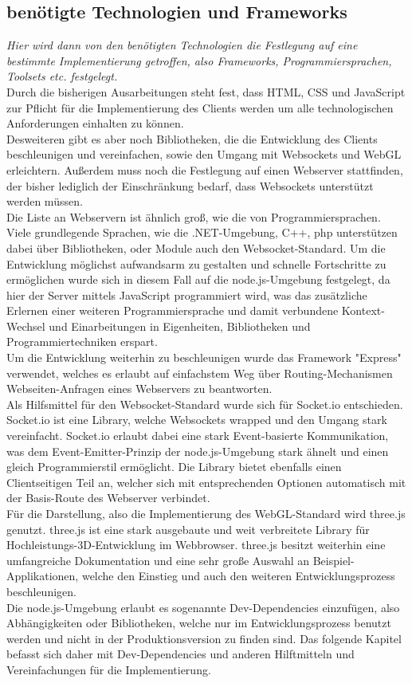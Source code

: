 \subsection{benötigte Technologien und Frameworks}
\label{subsec:Technologien}

\emph{Hier wird dann von den benötigten Technologien die Festlegung auf eine bestimmte Implementierung getroffen, also Frameworks, Programmiersprachen, Toolsets etc. festgelegt.}\\
Durch die bisherigen Ausarbeitungen steht fest, dass HTML, CSS und JavaScript zur Pflicht für die Implementierung des Clients werden um alle technologischen Anforderungen einhalten zu können.\\
Desweiteren gibt es aber noch Bibliotheken, die die Entwicklung des Clients beschleunigen und vereinfachen, sowie den Umgang mit Websockets und WebGL erleichtern. Außerdem muss noch die Festlegung auf einen Webserver stattfinden, der bisher lediglich der Einschränkung bedarf, dass Websockets unterstützt werden müssen.\\
Die Liste an Webservern ist ähnlich groß, wie die von Programmiersprachen. Viele grundlegende Sprachen, wie die .NET-Umgebung, C++, php \ua unterstützen dabei über Bibliotheken, oder Module auch den Websocket-Standard. Um die Entwicklung möglichst aufwandsarm zu gestalten und schnelle Fortschritte zu ermöglichen wurde sich in diesem Fall auf die node.js-Umgebung festgelegt, da hier der Server mittels JavaScript programmiert wird, was das zusätzliche Erlernen einer weiteren Programmiersprache und damit verbundene Kontext-Wechsel und Einarbeitungen in Eigenheiten, Bibliotheken und Programmiertechniken erspart.\\
Um die Entwicklung weiterhin zu beschleunigen wurde das Framework "Express" verwendet, welches es erlaubt auf einfachstem Weg über Routing-Mechanismen Webseiten-Anfragen eines Webservers zu beantworten.\\
Als Hilfsmittel für den Websocket-Standard wurde sich für Socket.io entschieden. Socket.io ist eine Library, welche Websockets wrapped und den Umgang stark vereinfacht. Socket.io erlaubt dabei eine stark Event-basierte Kommunikation, was dem Event-Emitter-Prinzip der node.js-Umgebung stark ähnelt und einen gleich Programmierstil ermöglicht. Die Library bietet ebenfalls einen Clientseitigen Teil an, welcher sich mit entsprechenden Optionen automatisch mit der Basis-Route des Webserver verbindet.\\
Für die Darstellung, also die Implementierung des WebGL-Standard wird three.js genutzt. three.js ist eine stark ausgebaute und weit verbreitete Library für Hochleistungs-3D-Entwicklung im Webbrowser. three.js besitzt weiterhin eine umfangreiche Dokumentation und eine sehr große Auswahl an Beispiel-Applikationen, welche den Einstieg und auch den weiteren Entwicklungsprozess beschleunigen.
\\
Die node.js-Umgebung erlaubt es sogenannte Dev-Dependencies einzufügen, also Abhängigkeiten oder Bibliotheken, welche nur im Entwicklungsprozess benutzt werden und nicht in der Produktionsversion zu finden sind. Das folgende Kapitel befasst sich daher mit Dev-Dependencies und anderen Hilftmitteln und Vereinfachungen für die Implementierung.
